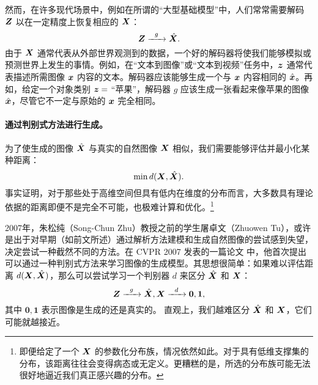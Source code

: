 \documentclass[../../book-main.tex]{subfiles}
\begin{document}
然而，在许多现代场景中，例如在所谓的“大型基础模型”中，人们常常需要解码 $\bm{Z}$ 以在一定精度上恢复相应的 $\bm{X}$：
\begin{equation}
    \bm{Z}   \xrightarrow{\hspace{2mm} g  \hspace{2mm}} \hat {\bm{X}}.
       \label{eqn:decoding-deep-networks}
\end{equation}
由于 $\bm{X}$ 通常代表从外部世界观测到的数据，一个好的解码器将使我们能够模拟或预测世界上发生的事情。例如，在“文本到图像”或“文本到视频”任务中，$\bm{z}$ 通常代表描述所需图像 $\bm{x}$ 内容的文本。解码器应该能够生成一个与 $\bm{x}$ 内容相同的 $\hat {\bm{x}}$。再如，给定一个对象类别 $\bm{z} = $ “苹果”，解码器 $g$ 应该生成一张看起来像苹果的图像 $\hat {\bm{x}}$，尽管它不一定与原始的 $\bm{x}$ 完全相同。 



\paragraph{通过判别式方法进行生成。}

为了使生成的图像 $\hat {\bm{X}}$ 与真实的自然图像 $\bm{X}$ 相似，我们需要能够评估并最小化某种距离：
\begin{equation}
    \min d(\bm{X}, \hat {\bm{X}}).
\end{equation}
事实证明，对于那些处于高维空间但具有低内在维度的分布而言，大多数具有理论依据的距离即便不是完全不可能，也极难计算和优化。\footnote{即便给定了一个 $\bm{X}$ 的参数化分布族，情况依然如此。对于具有低维支撑集的分布，该距离往往会变得病态或无定义。更糟糕的是，所选的分布族可能无法很好地逼近我们真正感兴趣的分布。} 

2007年，朱松纯（Song-Chun Zhu）教授之前的学生屠卓文（Zhuowen Tu），或许是出于对早期（如前文所述）通过解析方法建模和生成自然图像的尝试感到失望，决定尝试一种截然不同的方法。在 CVPR 2007 发表的一篇论文 \cite{Tu-2007} 中，他首次提出可以通过一种判别式方法来学习图像的生成模型。其思想很简单：如果难以评估距离 $d(\bm{X}, \hat {\bm{X}})$，那么可以尝试学习一个判别器 $d$ 来区分 $\hat {\bm{X}}$ 和 $\bm{X}$：
\begin{equation}
    \bm{Z}   \xrightarrow{\hspace{2mm} g  \hspace{2mm}} \hat {\bm{X}}, \bm{X} \xrightarrow{\hspace{2mm} d  \hspace{2mm}} \boldsymbol{0}, \boldsymbol{1},
       \label{eqn:gan-networks}
\end{equation}
其中 $\boldsymbol{0}, \boldsymbol{1}$ 表示图像是生成的还是真实的。
直观上，我们越难区分 $\hat {\bm{X}}$ 和 $\bm{X}$，它们可能就越接近。
\end{document}
